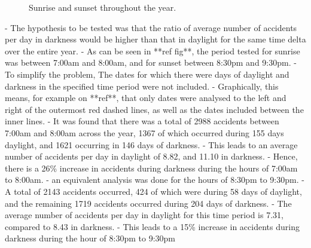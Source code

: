 \documentclass[12pt]{article}
\begin{document}
\begin{figure}[h]
\centering     %
{}
\caption{Sunrise and sunset throughout the year.}
\end{figure}

- The hypothesis to be tested was that the ratio of average number of accidents per day in darkness would be higher than that in daylight for the same time delta over the entire year.
- As can be seen in **ref fig**, the period tested for sunrise was between 7:00am and 8:00am, and for sunset between 8:30pm and 9:30pm.
- To simplify the problem, The dates for which there were days of daylight and darkness in the specified time period were not included.
- Graphically, this means, for example on **ref**, that only dates were analysed to the left and right of the outermost red dashed lines, as well as the dates included between the inner lines.
- It was found that there was a total of 2988 accidents between 7:00am and 8:00am across the year, 1367 of which occurred during 155 days daylight, and 1621 occurring in 146 days of darkness.
- This leads to an average number of accidents per day in daylight of 8.82, and 11.10 in darkness.
- Hence, there is a 26\% increase in accidents during darkness during the hours of 7:00am  to 8:00am.
- an equivalent analysis was done for the hours of 8:30pm to 9:30pm. 
- A total of 2143 accidents occurred, 424 of which were during 58 days of daylight, and the remaining 1719 accidents occurred during 204 days of darkness.
- The average number of accidents per day in daylight for this time period is 7.31, compared to 8.43 in darkness.
- This leads to a 15\% increase in accidents during darkness during the hour of 8:30pm to 9:30pm
\end{document}
